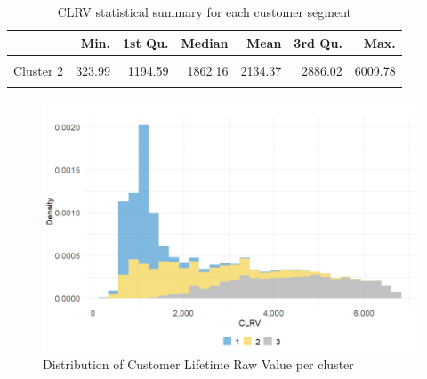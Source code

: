 \documentclass[
]{book}
\begin{document}
\begin{table}[H]

\caption{\label{tab:custValuesclust}CLRV statistical summary for each customer segment}
\centering
\begin{tabular}[t]{lrrrrrr}
\toprule
  & Min. & 1st Qu. & Median & Mean & 3rd Qu. & Max.\\
\midrule
\cellcolor{gray!6}{Cluster 1} & \cellcolor{gray!6}{333.82} & \cellcolor{gray!6}{837.50} & \cellcolor{gray!6}{1094.51} & \cellcolor{gray!6}{1134.40} & \cellcolor{gray!6}{1264.28} & \cellcolor{gray!6}{4679.80}\\
Cluster 2 & 323.99 & 1194.59 & 1862.16 & 2134.37 & 2886.02 & 6009.78\\
\cellcolor{gray!6}{Cluster 3} & \cellcolor{gray!6}{1268.74} & \cellcolor{gray!6}{3393.93} & \cellcolor{gray!6}{4489.62} & \cellcolor{gray!6}{4408.44} & \cellcolor{gray!6}{5454.71} & \cellcolor{gray!6}{6815.42}\\
\bottomrule
\end{tabular}
\end{table}

\begin{figure}

{\centering \includegraphics[width=12.5in]{./imgs/clrv_density_per_cluster} 

}

\caption{Distribution of Customer Lifetime Raw Value per cluster}\label{fig:clrvDensClust}
\end{figure}
\end{document}
